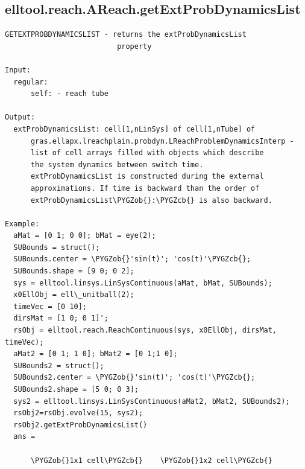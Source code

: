 \documentclass[letterpaper,10pt,english]{sphinxmanual}
\def\PYGZob{\char`\{}
\def\PYGZcb{\char`\}}
\begin{document}
\subsection{elltool.reach.AReach.getExtProbDynamicsList}
\label{chap_functions:elltool-reach-areach-getextprobdynamicslist}
\begin{Verbatim}[commandchars=\\\{\}]
GETEXTPROBDYNAMICSLIST - returns the extProbDynamicsList
                          property

Input:
  regular:
      self: - reach tube

Output:
  extProbDynamicsList: cell[1,nLinSys] of cell[1,nTube] of
      gras.ellapx.lreachplain.probdyn.LReachProblemDynamicsInterp -
      list of cell arrays filled with objects which describe
      the system dynamics between switch time.
      extProbDynamicsList is constructed during the external
      approximations. If time is backward than the order of
      extProbDynamicsList\PYGZob{}:\PYGZcb{} is also backward.

Example:
  aMat = [0 1; 0 0]; bMat = eye(2);
  SUBounds = struct();
  SUBounds.center = \PYGZob{}'sin(t)'; 'cos(t)'\PYGZcb{};
  SUBounds.shape = [9 0; 0 2];
  sys = elltool.linsys.LinSysContinuous(aMat, bMat, SUBounds);
  x0EllObj = ell\_unitball(2);
  timeVec = [0 10];
  dirsMat = [1 0; 0 1]';
  rsObj = elltool.reach.ReachContinuous(sys, x0EllObj, dirsMat, timeVec);
  aMat2 = [0 1; 1 0]; bMat2 = [0 1;1 0];
  SUBounds2 = struct();
  SUBounds2.center = \PYGZob{}'sin(t)'; 'cos(t)'\PYGZcb{};
  SUBounds2.shape = [5 0; 0 3];
  sys2 = elltool.linsys.LinSysContinuous(aMat2, bMat2, SUBounds2);
  rsObj2=rsObj.evolve(15, sys2);
  rsObj2.getExtProbDynamicsList()
  ans =

      \PYGZob{}1x1 cell\PYGZcb{}    \PYGZob{}1x2 cell\PYGZcb{}
\end{Verbatim}
\end{document}
